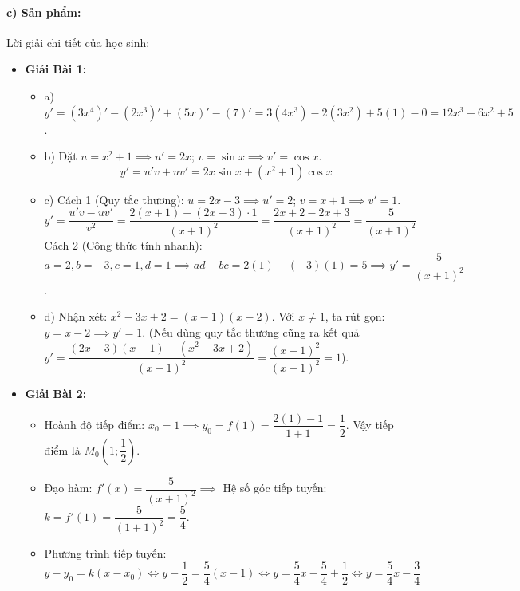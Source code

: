 \documentclass[12pt, a4paper]{article}
\begin{document}
\paragraph{c) Sản phẩm:} Lời giải chi tiết của học sinh:
\begin{itemize}[leftmargin=0.8cm]
    \item \textbf{Giải Bài 1:}
    \begin{itemize}[leftmargin=0.4cm]
        \item a) $y' = (3x^4)' - (2x^3)' + (5x)' - (7)' = 3(4x^3) - 2(3x^2) + 5(1) - 0 = 12x^3 - 6x^2 + 5$.
        \item b) Đặt $u = x^2 + 1 \implies u' = 2x$; $v = \sin x \implies v' = \cos x$.
        $$y' = u'v + uv' = 2x \sin x + (x^2 + 1)\cos x$$
        \item c) Cách 1 (Quy tắc thương): $u = 2x - 3 \implies u' = 2$; $v = x + 1 \implies v' = 1$.
        $$y' = \dfrac{u'v - uv'}{v^2} = \dfrac{2(x + 1) - (2x - 3) \cdot 1}{(x + 1)^2} = \dfrac{2x + 2 - 2x + 3}{(x + 1)^2} = \dfrac{5}{(x + 1)^2}$$
        Cách 2 (Công thức tính nhanh): $a = 2, b = -3, c = 1, d = 1 \implies ad - bc = 2(1) - (-3)(1) = 5 \implies y' = \dfrac{5}{(x + 1)^2}$.
        \item d) Nhận xét: $x^2 - 3x + 2 = (x - 1)(x - 2)$. Với $x \neq 1$, ta rút gọn: $y = x - 2 \implies y' = 1$.
        (Nếu dùng quy tắc thương cũng ra kết quả $y' = \dfrac{(2x - 3)(x - 1) - (x^2 - 3x + 2)}{(x - 1)^2} = \dfrac{(x - 1)^2}{(x - 1)^2} = 1$).
    \end{itemize}
    \item \textbf{Giải Bài 2:}
    \begin{itemize}[leftmargin=0.4cm]
        \item Hoành độ tiếp điểm: $x_0 = 1 \implies y_0 = f(1) = \dfrac{2(1) - 1}{1 + 1} = \dfrac{1}{2}$. Vậy tiếp điểm là $M_0\left(1; \dfrac{1}{2}\right)$.
        \item Đạo hàm: $f'(x) = \dfrac{5}{(x + 1)^2} \implies$ Hệ số góc tiếp tuyến: $k = f'(1) = \dfrac{5}{(1 + 1)^2} = \dfrac{5}{4}$.
        \item Phương trình tiếp tuyến:
        $$y - y_0 = k(x - x_0) \iff y - \dfrac{1}{2} = \dfrac{5}{4}(x - 1) \iff y = \dfrac{5}{4}x - \dfrac{5}{4} + \dfrac{1}{2} \iff y = \dfrac{5}{4}x - \dfrac{3}{4}$$
    \end{itemize}
\end{itemize}
\end{document}
